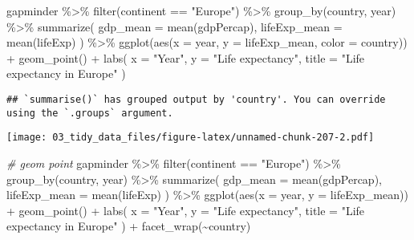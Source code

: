 \documentclass[
]{book}
\newenvironment{Shaded}{\begin{snugshade}}{\end{snugshade}}
\newcommand{\AttributeTok}[1]{\textcolor[rgb]{0.77,0.63,0.00}{#1}}
\newcommand{\CommentTok}[1]{\textcolor[rgb]{0.56,0.35,0.01}{\textit{#1}}}
\newcommand{\FunctionTok}[1]{\textcolor[rgb]{0.00,0.00,0.00}{#1}}
\newcommand{\NormalTok}[1]{#1}
\newcommand{\SpecialCharTok}[1]{\textcolor[rgb]{0.00,0.00,0.00}{#1}}
\newcommand{\StringTok}[1]{\textcolor[rgb]{0.31,0.60,0.02}{#1}}
\begin{document}
\begin{Shaded}
\begin{Highlighting}[]
\NormalTok{gapminder }\SpecialCharTok{\%\textgreater{}\%}
  \FunctionTok{filter}\NormalTok{(continent }\SpecialCharTok{==} \StringTok{"Europe"}\NormalTok{) }\SpecialCharTok{\%\textgreater{}\%}
  \FunctionTok{group\_by}\NormalTok{(country, year) }\SpecialCharTok{\%\textgreater{}\%}
  \FunctionTok{summarize}\NormalTok{(}
    \AttributeTok{gdp\_mean =} \FunctionTok{mean}\NormalTok{(gdpPercap),}
    \AttributeTok{lifeExp\_mean =} \FunctionTok{mean}\NormalTok{(lifeExp)}
\NormalTok{  ) }\SpecialCharTok{\%\textgreater{}\%}
  \FunctionTok{ggplot}\NormalTok{(}\FunctionTok{aes}\NormalTok{(}\AttributeTok{x =}\NormalTok{ year, }\AttributeTok{y =}\NormalTok{ lifeExp\_mean, }\AttributeTok{color =}\NormalTok{ country)) }\SpecialCharTok{+}
  \FunctionTok{geom\_point}\NormalTok{() }\SpecialCharTok{+}
  \FunctionTok{labs}\NormalTok{(}
    \AttributeTok{x =} \StringTok{"Year"}\NormalTok{,}
    \AttributeTok{y =} \StringTok{"Life expectancy"}\NormalTok{,}
    \AttributeTok{title =} \StringTok{"Life expectancy in Europe"}
\NormalTok{  )}
\end{Highlighting}
\end{Shaded}

\begin{verbatim}
## `summarise()` has grouped output by 'country'. You can override using the `.groups` argument.
\end{verbatim}

\texttt{[image: 03\_tidy\_data\_files/figure-latex/unnamed-chunk-207-2.pdf]}

\begin{Shaded}
\begin{Highlighting}[]
\CommentTok{\# geom point}
\NormalTok{gapminder }\SpecialCharTok{\%\textgreater{}\%}
  \FunctionTok{filter}\NormalTok{(continent }\SpecialCharTok{==} \StringTok{"Europe"}\NormalTok{) }\SpecialCharTok{\%\textgreater{}\%}
  \FunctionTok{group\_by}\NormalTok{(country, year) }\SpecialCharTok{\%\textgreater{}\%}
  \FunctionTok{summarize}\NormalTok{(}
    \AttributeTok{gdp\_mean =} \FunctionTok{mean}\NormalTok{(gdpPercap),}
    \AttributeTok{lifeExp\_mean =} \FunctionTok{mean}\NormalTok{(lifeExp)}
\NormalTok{  ) }\SpecialCharTok{\%\textgreater{}\%}
  \FunctionTok{ggplot}\NormalTok{(}\FunctionTok{aes}\NormalTok{(}\AttributeTok{x =}\NormalTok{ year, }\AttributeTok{y =}\NormalTok{ lifeExp\_mean)) }\SpecialCharTok{+}
  \FunctionTok{geom\_point}\NormalTok{() }\SpecialCharTok{+}
  \FunctionTok{labs}\NormalTok{(}
    \AttributeTok{x =} \StringTok{"Year"}\NormalTok{,}
    \AttributeTok{y =} \StringTok{"Life expectancy"}\NormalTok{,}
    \AttributeTok{title =} \StringTok{"Life expectancy in Europe"}
\NormalTok{  ) }\SpecialCharTok{+}
  \FunctionTok{facet\_wrap}\NormalTok{(}\SpecialCharTok{\textasciitilde{}}\NormalTok{country)}
\end{Highlighting}
\end{Shaded}
\end{document}
